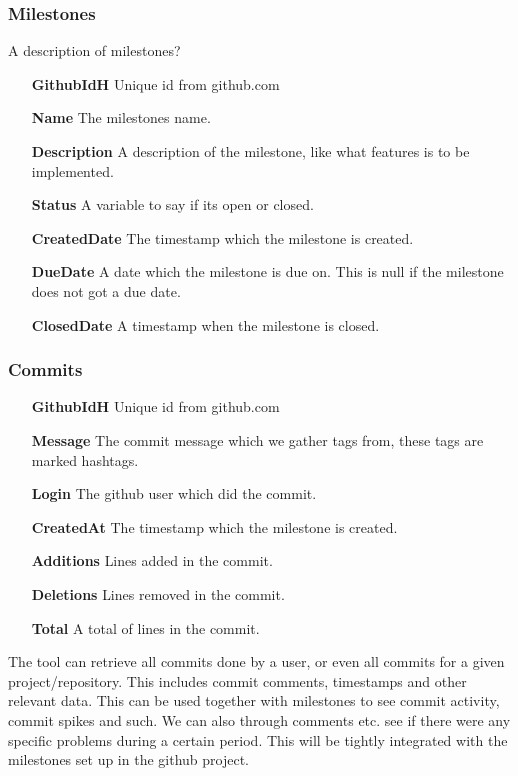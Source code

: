 \subsubsection*{Milestones}
A description of milestones?
\vspace{0.5cm}
\begin{itemize}
    \item[\textbf{GithubIdH}]{Unique id from github.com}
    \item[\textbf{Name}]{The milestones name.}
    \item[\textbf{Description}]{A description of the milestone, like what features is to be implemented.}
    \item[\textbf{Status}]{A variable to say if its open or closed.}
    \item[\textbf{CreatedDate}]{The timestamp which the milestone is created.}
    \item[\textbf{DueDate}]{A date which the milestone is due on. This is null if the milestone does not got a due date.}
    \item[\textbf{ClosedDate}]{A timestamp when the milestone is closed.}
\end{itemize}
\vspace{0.5cm}

\subsubsection*{Commits}
\vspace{0.5cm}
\begin{itemize}
    \item[\textbf{GithubIdH}]{Unique id from github.com}
    \item[\textbf{Message}]{The commit message which we gather tags from, these tags are marked hashtags.}
    \item[\textbf{Login}]{The github user which did the commit.}
    \item[\textbf{CreatedAt}]{The timestamp which the milestone is created.}
    \item[\textbf{Additions}]{Lines added in the commit.}
    \item[\textbf{Deletions}]{Lines removed in the commit.}
    \item[\textbf{Total}]{A total of lines in the commit.}
\end{itemize}
\vspace{0.5cm}

The tool can retrieve all commits done by a user, or even all commits for a given project/repository. This includes commit comments, timestamps and other relevant data. This can be used together with milestones to see commit activity, commit spikes and such. We can also through comments etc. see if there were any specific problems during a certain period. This will be tightly integrated with the milestones set up in the github project. 


